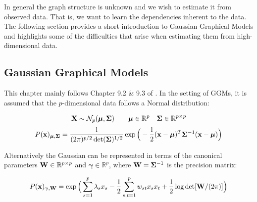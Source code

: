 In general the graph structure is unknown and we wish to estimate it from observed data.
That is, we want to learn the dependencies inherent to the data.
The following section provides a short introduction to Gaussian Graphical Models and highlights some of the difficulties that arise when estimating them from high-dimensional data.

\subsection{Gaussian Graphical Models}
This chapter mainly follows Chapter 9.2 \& 9.3 of \citet{hastie2015statistical}.
\label{GRAPH_SELECTION}
In the setting of \gls{GGM}s, it is assumed that the $p$-dimensional data follows a Normal distribution:

\begin{equation}
	\label{eq:normal_dist}
	\mathbf{X} \sim \mathcal{N}_{p}(\boldsymbol{\mu}, \mathbf{\Sigma})
	\quad \quad
	\boldsymbol{\mu }\in \mathbb{R}^{p} \quad \mathbf{\Sigma}\in \mathbb{R}^{p\times p} 
\end{equation}
$$ P(\mathbf{x})_{\boldsymbol{\mu}, \mathbf{\Sigma}} = \frac{1}{(2\pi)^{p/2}\det(\mathbf{\Sigma})^{1/2}} \exp\Big(-\frac{1}{2}(\mathbf{x}-\boldsymbol{\mu})^T \mathbf{\Sigma}^{-1}(\mathbf{x}-\boldsymbol{\mu})\Big)$$

Alternatively the Gaussian can be represented in terms of the canonical parameters $\mathbf{W}\in \mathbb{R}^{p\times p}$ and  $\boldsymbol{\gamma} \in \mathbb{R}^p$, where $\mathbf{W} = \mathbf{\Sigma}^{-1}$
is the precision matrix:

$$ P(\mathbf{x})_{\boldsymbol{\gamma}, \mathbf{W}} = \exp \Big( 
\sum_{s=1}^{p}\lambda_s {x}_s - \frac{1}{2} \sum_{s,t=1}^{p} w_{st}{x}_s {x}_t + \frac{1}{2} \log\det[\mathbf{W}/(2\pi)]
\Big)$$
 
